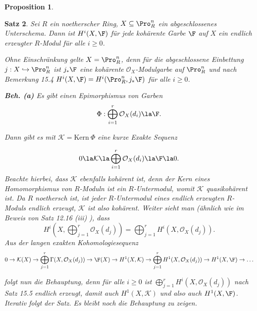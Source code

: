 \documentclass[11pt]{book}
\newtheorem{theorem}{Satz}[section]
\newtheorem{proposition}[theorem]{Proposition}
\theoremstyle{nonumberbreak}
\newenvironment{pr}[1][]{\ifthenelse{\equal{#1}{}}{\proof}{\proof[#1]}\rm}{\endproof}
\newcommand{\kernel}{\mathrm{Kern}\ }
\begin{document}
\begin{spacing}{1.4}
\begin{proposition}
\begin{pr}
 \end{pr}

\end{proposition}





\begin{theorem}   %
 Sei $R$ ein noetherscher Ring, $X \subseteq \Pro^{n}_R$ ein abgeschlossenes Unterschema. Dann ist  $H^{i}(X, \F)$ für jede kohärente Garbe $\F$ auf $X$ ein endlich erzeugter $R$-Modul für alle $i \geqslant 0$. 
 
 \begin{pr}
 Ohne Einschränkung gelte $X= \Pro^{n}_R$, denn für die abgeschlossene Einbettung $j:X \hookrightarrow \Pro^{n}_R$ ist $j_*\F$ eine kohärente $\mathcal{O}_X$-Modulgarbe auf $\Pro^n_R$ und nach Bemerkung 15.4 $H^{i}(X, \F) = H^{i}(\Pro^{n}_R, j_* \F)$ für alle $i \geqslant 0$. 
 
 \begin{compactenum}
 \item[\textbf{Beh. (a)}] Es gibt einen Epimorphismus von Garben 
 $$\Phi: \bigoplus_{i=1}^r \mathcal{O}_X(d_i) \la \F.$$
 
 \end{compactenum}
 
Dann gibt es mit $\mathcal{K} = \kernel \Phi$ eine kurze Exakte Sequenz 

$$0 \la \mathcal{K} \la \bigoplus_{i=1}^r \mathcal{O}_X(d_i) \la \F \la 0.$$
Beachte hierbei, dass $\mathcal{K}$ ebenfalls kohärent ist, denn der Kern eines Homomorphismus von $R$-Moduln ist ein $R$-Untermodul, womit $\mathcal{K}$ quasikohärent ist. Da $R$ noethersch ist, ist jeder $R$-Untermodul eines endlich erzeugten $R$-Moduls endlich erzeugt, $\mathcal{K}$ ist also kohärent. Weiter sieht man (ähnlich wie im Beweis von Satz 12.16 (iii) ), dass 
$$H^{i}\left( X, \bigoplus_{j=1}^r \mathcal{O}_X(d_j)\right) = \bigoplus_{j=1}^r H^{i}(X, \mathcal{O}_X(d_j)).$$ Aus der langen exakten Kohomologiesequenz
$$0 \rightarrow \mathcal{K}(X) \rightarrow \bigoplus_{j=1}^r \Gamma(X, \mathcal{O}_X(d_j)) \rightarrow \F(X) \rightarrow H^{1}(X, \mathcal{K}) \rightarrow \bigoplus_{j=1}^r H^{1}(X, \mathcal{O}_X(d_j)) \rightarrow H^{1}(X, \F) \rightarrow \ldots $$
 
 folgt nun die Behauptung, denn für alle $i \geqslant 0$ ist $\bigoplus_{j=1}^r H^{i}(X, \mathcal{O}_X(d_j))$ nach Satz 15.5 endlich erzeugt, damit auch $H^{1}(X, \mathcal{K})$ und also auch $H^{1}(X, \F)$. Iterativ folgt der Satz. Es bleibt noch die Behauptung zu zeigen.
 

\end{pr}
\end{theorem}
\end{spacing}
\end{document}
